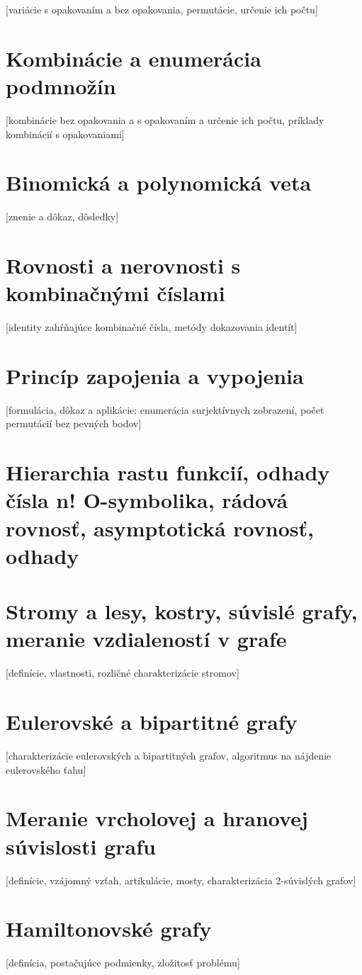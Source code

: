   [variácie s opakovaním a bez opakovania, permutácie, určenie ich počtu] 

\section {Kombinácie a enumerácia podmnožín}
  [kombinácie bez opakovania a s opakovaním a určenie ich počtu, príklady kombinácií s opakovaniami] 

\section {Binomická a polynomická veta}
  [znenie a dôkaz, dôsledky] 

\section {Rovnosti a nerovnosti s kombinačnými číslami}
  [identity zahŕňajúce kombinačné čísla, metódy dokazovania identít]

\section {Princíp zapojenia a vypojenia}
  [formulácia, dôkaz a aplikácie: enumerácia surjektívnych zobrazení, počet permutácií bez pevných bodov]






\section {Hierarchia rastu funkcií, odhady čísla n! O-symbolika, rádová rovnosť, asymptotická rovnosť, odhady}

\section {Stromy a lesy, kostry, súvislé grafy, meranie vzdialeností v grafe} 
  [definície, vlastnosti, rozličné charakterizácie stromov]

\section {Eulerovské a bipartitné grafy}
  [charakterizácie eulerovských a bipartitných grafov, algoritmus na nájdenie eulerovského ťahu]

\section {Meranie vrcholovej a hranovej súvislosti grafu}
  [definície, vzájomný vzťah, artikulácie, mosty, charakterizácia 2-súvislých grafov] 

\section {Hamiltonovské grafy}
  [definícia, postačujúce podmienky, zložitosť problému] 

